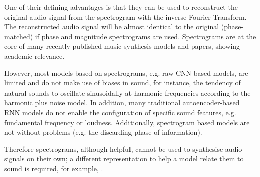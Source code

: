 One of their defining advantages is that they can be used to reconstruct the original audio signal from the spectrogram with the inverse Fourier Transform. The reconstructed audio signal will be almost identical to the original (phase-matched) if phase and magnitude spectrograms are used.
Spectrograms are at the core of many recently published music synthesis models and papers, showing academic relevance.

However, most models based on spectrograms, e.g. raw CNN-based models, are limited and do not make use of biases in sound, for instance, the tendency of natural sounds to oscillate sinusoidally at harmonic frequencies according to the harmonic plus noise model. In addition, many traditional autoencoder-based RNN models do not enable the configuration of specific sound features, e.g. fundamental frequency or loudness. Additionally, spectrogram based models are not without problems (e.g. the discarding phase of information).

Therefore spectrograms, although helpful, cannot be used to synthesise audio signals on their own; a different representation to help a model relate them to sound is required, for example, .